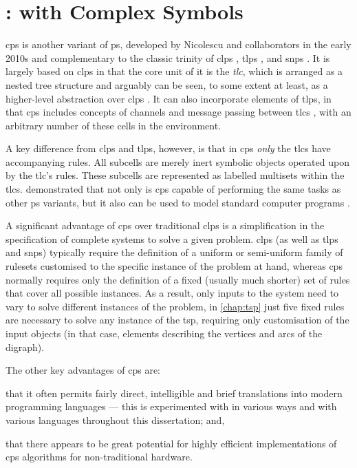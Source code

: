 \chapter{\label{chap:cpsystems}:  with Complex Symbols}

\gls{cps} is another variant of \gls{ps}, developed by Nicolescu and collaborators in the early 2010s and complementary to the classic trinity of \gls{clps} \cite{Paun2000}, \gls{tlps} \cite{Martin-Vide2003}, and \gls{snps} \cite{Ionescu2006}.  It is largely based on \gls{clps} in that the core unit of it is the \emph{\gls{tlc}}, which is arranged as a nested tree structure and arguably can be seen, to some extent at least, as a higher-level abstraction over \gls{clps} \cite{Nicolescu2018}.  It can also incorporate elements of \gls{tlps}, in that \gls{cps} includes concepts of channels and message passing between \glspl{tlc} \cite{Henderson2019}, with an arbitrary number of these cells in the environment.  

A key difference from \gls{clps} and \gls{tlps}, however, is that in \gls{cps} \emph{only} the \glspl{tlc} have accompanying rules.  All subcells are merely inert symbolic objects operated upon by the \gls{tlc}'s rules.  These subcells are represented as labelled multisets within the \glspl{tlc}.  \citeauthor{Nicolescu2014a} demonstrated that not only is \gls{cps} capable of performing the same tasks as other \gls{ps} variants, but it also can be used to model standard computer programs \cite{Nicolescu2014a}.

A significant advantage of \gls{cps} over traditional \gls{clps} is a simplification in the specification of complete systems to solve a given problem.  \Gls{clps} (as well as \gls{tlps} and \gls{snps}) typically require the definition of a uniform or semi-uniform family of \glspl{ruleset} customised to the specific instance of the problem at hand, whereas \gls{cps} normally requires only the definition of a fixed (usually much shorter) set of rules that cover all possible instances. As a result, only inputs to the system need to vary to solve different instances of the problem, \eg{} in \cref{chap:tsp} just five fixed rules are necessary to solve any instance of the \gls{tsp}, requiring only customisation of the input objects (in that case, elements describing the vertices and arcs of the digraph).

The other key advantages of \gls{cps} are:
\begin{inparaenum}[a)]
\item that it often permits fairly direct, intelligible and brief translations into modern programming languages --- this is experimented with in various ways and with various languages throughout this dissertation; and,
\item that there appears to be great potential for highly efficient implementations of \gls{cps} algorithms for non-traditional hardware.
\end{inparaenum}



